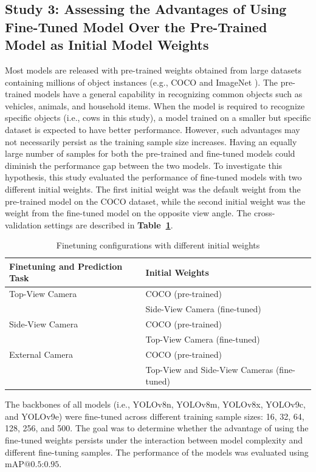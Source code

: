 \subsection*{Study 3: Assessing the Advantages of Using Fine-Tuned Model Over the Pre-Trained Model as Initial Model Weights}

Most models are released with pre-trained weights obtained from large datasets containing millions of object instances (e.g., COCO \cite{lin2014microsoft} and ImageNet \cite{deng2009imagenet}). The pre-trained models have a general capability in recognizing common objects such as vehicles, animals, and household items. When the model is required to recognize specific objects (i.e., cows in this study), a model trained on a smaller but specific dataset is expected to have better performance. However, such advantages may not necessarily persist as the training sample size increases. Having an equally large number of samples for both the pre-trained and fine-tuned models could diminish the performance gap between the two models. To investigate this hypothesis, this study evaluated the performance of fine-tuned models with two different initial weights. The first initial weight was the default weight from the pre-trained model on the COCO dataset, while the second initial weight was the weight from the fine-tuned model on the opposite view angle. The cross-validation settings are described in \textbf{Table~\ref{tab:fintune_config}}.

\begin{table}[h]
    \caption{Finetuning configurations with different initial weights}
    \centering
    \begin{tabular}{ll}
        \toprule
        \textbf{Finetuning and Prediction Task} & \textbf{Initial Weights} \\
        \midrule
        Top-View Camera & COCO (pre-trained) \\
        & Side-View Camera (fine-tuned) \\
        \midrule
        Side-View Camera & COCO (pre-trained) \\
        & Top-View Camera (fine-tuned) \\
        \midrule
        External Camera & COCO (pre-trained) \\
        & Top-View and Side-View Cameras (fine-tuned) \\
        \bottomrule
    \end{tabular}
    \label{tab:fintune_config}
\end{table}

The backbones of all models (i.e., YOLOv8n, YOLOv8m, YOLOv8x, YOLOv9c, and YOLOv9e) were fine-tuned across different training sample sizes: 16, 32, 64, 128, 256, and 500. The goal was to determine whether the advantage of using the fine-tuned weights persists under the interaction between model complexity and different fine-tuning samples. The performance of the models was evaluated using $\text{mAP@{0.5:0.95}}$.



